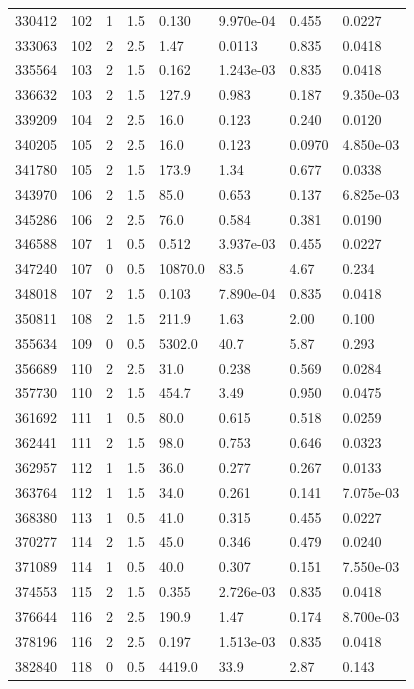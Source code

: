 \documentclass[preview]{standalone}
\begin{document}
{{{{{\begin{tabular}{L{1.2cm}C{1.2cm} C{0.3cm}C{0.5cm} C{1.4cm}C{1.4cm} C{1.4cm}C{1.4cm}}
  330412  &   102  & 1     & 1.5 &  0.130  & 9.970e-04  & 0.455 &  0.0227   \\ 
  333063  &   102  & 2     & 2.5 &  1.47  & 0.0113  & 0.835 &  0.0418   \\ 
  335564  &   103  & 2     & 1.5 &  0.162  & 1.243e-03  & 0.835 &  0.0418   \\ 
  336632  &   103  & 2     & 1.5 &  127.9  & 0.983  & 0.187 &  9.350e-03   \\ 
  339209  &   104  & 2     & 2.5 &  16.0  & 0.123  & 0.240 &  0.0120   \\ 
  340205  &   105  & 2     & 2.5 &  16.0  & 0.123  & 0.0970 &  4.850e-03   \\ 
  341780  &   105  & 2     & 1.5 &  173.9  & 1.34  & 0.677 &  0.0338   \\ 
  343970  &   106  & 2     & 1.5 &  85.0  & 0.653  & 0.137 &  6.825e-03   \\ 
  345286  &   106  & 2     & 2.5 &  76.0  & 0.584  & 0.381 &  0.0190   \\ 
  346588  &   107  & 1     & 0.5 &  0.512  & 3.937e-03  & 0.455 &  0.0227   \\ 
  347240  &   107  & 0     & 0.5 &  10870.0  & 83.5  & 4.67 &  0.234   \\ 
  348018  &   107  & 2     & 1.5 &  0.103  & 7.890e-04  & 0.835 &  0.0418   \\ 
  350811  &   108  & 2     & 1.5 &  211.9  & 1.63  & 2.00 &  0.100   \\ 
  355634  &   109  & 0     & 0.5 &  5302.0  & 40.7  & 5.87 &  0.293   \\ 
  356689  &   110  & 2     & 2.5 &  31.0  & 0.238  & 0.569 &  0.0284   \\ 
  357730  &   110  & 2     & 1.5 &  454.7  & 3.49  & 0.950 &  0.0475   \\ 
  361692  &   111  & 1     & 0.5 &  80.0  & 0.615  & 0.518 &  0.0259   \\ 
  362441  &   111  & 2     & 1.5 &  98.0  & 0.753  & 0.646 &  0.0323   \\ 
  362957  &   112  & 1     & 1.5 &  36.0  & 0.277  & 0.267 &  0.0133   \\ 
  363764  &   112  & 1     & 1.5 &  34.0  & 0.261  & 0.141 &  7.075e-03   \\ 
  368380  &   113  & 1     & 0.5 &  41.0  & 0.315  & 0.455 &  0.0227   \\ 
  370277  &   114  & 2     & 1.5 &  45.0  & 0.346  & 0.479 &  0.0240   \\ 
  371089  &   114  & 1     & 0.5 &  40.0  & 0.307  & 0.151 &  7.550e-03   \\ 
  374553  &   115  & 2     & 1.5 &  0.355  & 2.726e-03  & 0.835 &  0.0418   \\ 
  376644  &   116  & 2     & 2.5 &  190.9  & 1.47  & 0.174 &  8.700e-03   \\ 
  378196  &   116  & 2     & 2.5 &  0.197  & 1.513e-03  & 0.835 &  0.0418   \\ 
  382840  &   118  & 0     & 0.5 &  4419.0  & 33.9  & 2.87 &  0.143   \\ 
\hline 
\end{tabular} 

}}}}}
\end{document}
